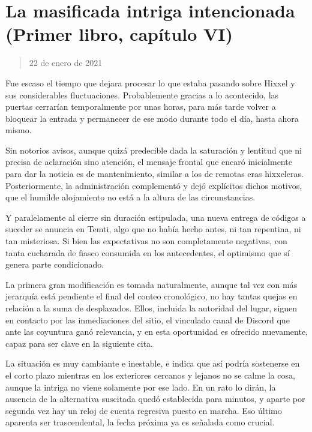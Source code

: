 \documentclass[
]{book}
\begin{document}
\hypertarget{la-masificada-intriga-intencionada-primer-libro-capuxedtulo-vi}{%
\section{La masificada intriga intencionada (Primer libro, capítulo VI)}\label{la-masificada-intriga-intencionada-primer-libro-capuxedtulo-vi}}

\begin{quote}
22 de enero de 2021
\end{quote}

Fue escaso el tiempo que dejara procesar lo que estaba pasando sobre Hixxel y sus considerables fluctuaciones. Probablemente gracias a lo acontecido, las puertas cerrarían temporalmente por unas horas, para más tarde volver a bloquear la entrada y permanecer de ese modo durante todo el día, hasta ahora mismo.

Sin notorios avisos, aunque quizá predecible dada la saturación y lentitud que ni precisa de aclaración sino atención, el mensaje frontal que encaró inicialmente para dar la noticia es de mantenimiento, similar a los de remotas eras hixxeleras. Posteriormente, la administración complementó y dejó explícitos dichos motivos, que el humilde alojamiento no está a la altura de las circunstancias.

Y paralelamente al cierre sin duración estipulada, una nueva entrega de códigos a suceder se anuncia en Temti, algo que no había hecho antes, ni tan repentina, ni tan misteriosa. Si bien las expectativas no son completamente negativas, con tanta cucharada de fiasco consumida en los antecedentes, el optimismo que sí genera parte condicionado.

La primera gran modificación es tomada naturalmente, aunque tal vez con más jerarquía está pendiente el final del conteo cronológico, no hay tantas quejas en relación a la suma de desplazados. Ellos, incluida la autoridad del lugar, siguen en contacto por las inmediaciones del sitio, el vinculado canal de Discord que ante las coyuntura ganó relevancia, y en esta oportunidad es ofrecido nuevamente, capaz para ser clave en la siguiente cita.

La situación es muy cambiante e inestable, e indica que así podría sostenerse en el corto plazo mientras en los exteriores cercanos y lejanos no se calme la cosa, aunque la intriga no viene solamente por ese lado. En un rato lo dirán, la ausencia de la alternativa suscitada quedó establecida para minutos, y aparte por segunda vez hay un reloj de cuenta regresiva puesto en marcha. Eso último aparenta ser trascendental, la fecha próxima ya es señalada como crucial.
\end{document}
